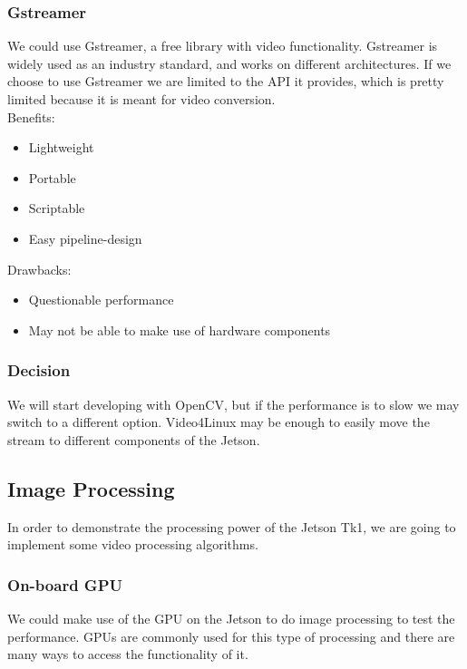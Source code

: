 	\subsubsection{Gstreamer}
	We could use Gstreamer, a free library with video functionality.
Gstreamer is widely used as an industry standard, and works on different architectures. If we choose to use Gstreamer we are limited to the API it provides, which is pretty limited because it is meant for video conversion.\\
			
	Benefits:
	\begin{itemize}[leftmargin=2cm,labelindent=2cm]
		\item Lightweight
		\item Portable
		\item Scriptable
		\item Easy pipeline-design
	\end{itemize}
	
	Drawbacks:
	\begin{itemize}[leftmargin=2cm,labelindent=2cm]
		\item Questionable performance
		\item May not be able to make use of hardware components\\
	\end{itemize}
	
	\subsubsection{Decision}
	We will start developing with OpenCV, but if the performance is to slow we may switch to a different option. Video4Linux may be enough to easily move the stream to different components of the Jetson.
	
\subsection{Image Processing}
In order to demonstrate the processing power of the Jetson Tk1, we are going to implement some video processing algorithms.\\
	\subsubsection{On-board GPU}
	We could make use of the GPU on the Jetson to do image processing to test the performance. GPUs are commonly used for this type of processing and there are many ways to access the functionality of it.
		

